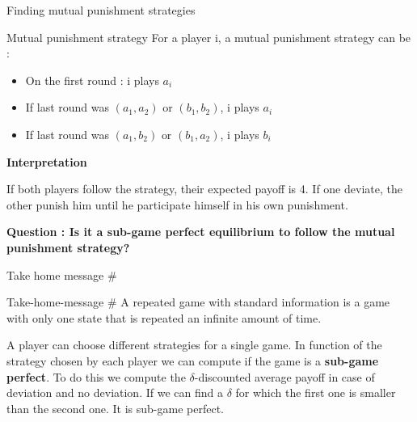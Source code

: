 \begin{frame}{Finding mutual punishment strategies}
    \begin{block}{Mutual punishment strategy}
        For a player i, a {\color{green}mutual punishment strategy} can be :
        \begin{itemize}
        	\item On the first round : i plays $a_i$ \pause
        	\item If last round was $(a_1,a_2) \text{ or } (b_1,b_2)$, i plays $a_i$ \pause
        	\item If last round was $(a_1,b_2) \text{ or } (b_1,a_2)$, i plays $b_i$
        \end{itemize}
    \end{block}
    \textbf{\color{green}Interpretation}
    
    If both players follow the strategy, their expected payoff is 4. If one deviate, the other punish him until he participate himself in his own punishment.
    
    \textbf{Question : Is it a sub-game perfect equilibrium to follow the mutual punishment strategy?}
    
\end{frame}

\begin{frame}{Take home message \#}
    \begin{block}{Take-home-message \#}
        A {\color{green}repeated game with standard information} is a game with only one state that is repeated an infinite amount of time.
        
        A player can choose different strategies for a single game. In function of the strategy chosen by each player we can compute if the game is a \textbf{sub-game perfect}. To do this we compute the $\delta$-discounted average payoff in case of deviation and no deviation. If we can find a $\delta$ for which the first one is smaller than the second one. It is sub-game perfect.
        
        
    \end{block}

\end{frame}
